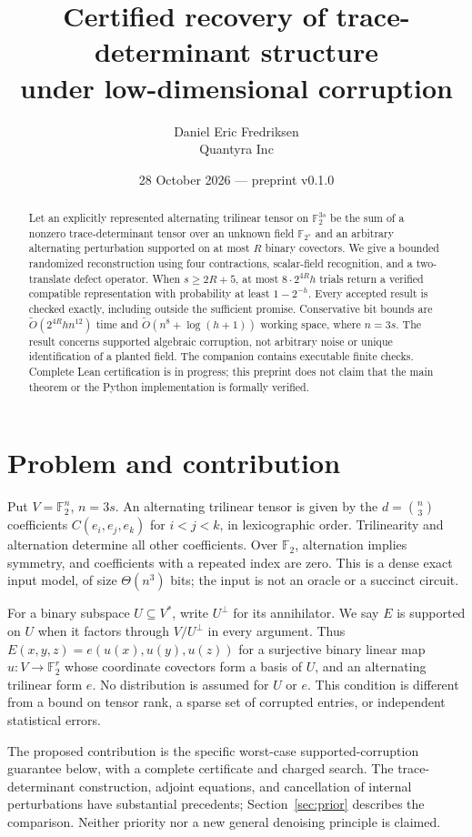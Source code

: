\documentclass[11pt]{article}
\title{Certified recovery of trace-determinant structure\\under low-dimensional corruption}
\author{Daniel Eric Fredriksen\\Quantyra Inc}
\date{28 October 2026 --- preprint v0.1.0}
\newcommand{\F}{\mathbb F}
\begin{document}
\maketitle
\begin{abstract}
Let an explicitly represented alternating trilinear tensor on $\F_2^{3s}$ be
the sum of a nonzero trace-determinant tensor over an unknown field
$\F_{2^s}$ and an arbitrary alternating perturbation supported on at most $R$
binary covectors. We give a bounded randomized reconstruction using four
contractions, scalar-field recognition, and a two-translate defect operator.
When $s\geq2R+5$, at most $8\cdot2^{4R}h$ trials return a verified compatible
representation with probability at least $1-2^{-h}$. Every accepted result is
checked exactly, including outside the sufficient promise. Conservative bit
bounds are $\widetilde O(2^{4R}h n^{12})$ time and
$\widetilde O(n^8+\log(h+1))$ working space, where $n=3s$.
The result concerns supported algebraic corruption, not arbitrary noise or
unique identification of a planted field. The companion contains executable
finite checks. Complete Lean certification is in progress; this preprint does
not claim that the main theorem or the Python implementation is formally verified.
\end{abstract}

\section{Problem and contribution}
Put $V=\F_2^n$, $n=3s$. An alternating trilinear tensor is given by the
$d=\binom n3$ coefficients $C(e_i,e_j,e_k)$ for $i<j<k$, in lexicographic
order. Trilinearity and alternation determine all other coefficients. Over
$\F_2$, alternation implies symmetry, and coefficients with a repeated index
are zero. This is a dense exact input model, of size $\Theta(n^3)$ bits;
the input is not an oracle or a succinct circuit.

For a binary subspace $U\subseteq V^*$, write $U^\perp$ for its annihilator.
We say $E$ is supported on $U$ when it factors through $V/U^\perp$ in every
argument. Thus $E(x,y,z)=e(u(x),u(y),u(z))$ for a surjective binary linear map
$u:V\to\F_2^r$ whose coordinate covectors form a basis of $U$, and an
alternating trilinear form $e$. No distribution is assumed for $U$ or $e$.
This condition is different from a bound on tensor rank, a sparse set of
corrupted entries, or independent statistical errors.

The proposed contribution is the specific worst-case supported-corruption
guarantee below, with a complete certificate and charged search. The
trace-determinant construction, adjoint equations, and cancellation of internal
perturbations have substantial precedents; Section~\ref{sec:prior} describes
the comparison. Neither priority nor a new general denoising principle is claimed.
\end{document}
